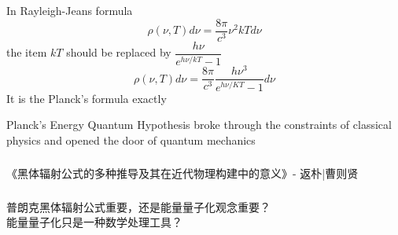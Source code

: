 \begin{frame}
    In Rayleigh-Jeans formula
    \begin{equation*}
        \rho(\nu, T) d \nu=\frac{8 \pi}{c^{3}} \nu^{2} k T d \nu 
    \end{equation*}
    the item $kT$ should be replaced by $\dfrac{h \nu}{e^{ h \nu / k T}-1}$
    \begin{equation*}
        \rho(\nu, T) d \nu=\frac{8 \pi}{c^{3}} \frac{h \nu^{3}}{e^{h \nu / K T}-1} d \nu
    \end{equation*}
    It is the Planck's formula exactly 
\end{frame}

\begin{frame}
    \begin{tcolorbox4}
        Planck's Energy Quantum Hypothesis broke through the constraints of classical physics and 
        opened the door of quantum mechanics 
    \end{tcolorbox4}
\end{frame}

\begin{frame}
    \frametitle{}
    \centering

 《黑体辐射公式的多种推导及其在近代物理构建中的意义》- 返朴|曹则贤
\end{frame}


\begin{frame}
    \frametitle{}
    \begin{tcolorbox3}[学术讨论]
        普朗克黑体辐射公式重要，还是能量量子化观念重要？\\
        能量量子化只是一种数学处理工具？
    \end{tcolorbox3}
\end{frame}

